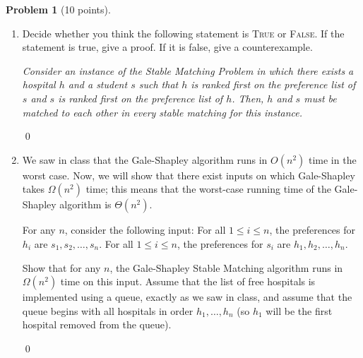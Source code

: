 \documentclass[12pt]{article}
\theoremstyle{definition}
\newtheorem{question}{Problem}
\newenvironment{solution}{\bigskip\noindent{\em Solution.}  \ignorespaces}{\hfill\qed}
\begin{document}
\begin{question}[10 points]
	
\begin{enumerate}[label=(\alph*), leftmargin=*]   
    \item Decide whether you think the following statement is \textsc{True} or \textsc{False}.  If the statement is true, give a proof.  If it is false, give a counterexample.\\

  \smallskip

 {\em Consider an instance of the Stable Matching Problem in which there exists a hospital $h$ and a student $s$ such that $h$ is ranked first on the preference list of $s$ and $s$ is ranked first on the preference list of $h$.  Then, $h$ and $s$ must be matched to each other in every stable matching for this instance.}


    \begin{solution}

    \end{solution}



    \item We saw in class that the Gale-Shapley algorithm runs in $O(n^2)$ time in the worst case.  Now, we will show that there exist inputs on which Gale-Shapley takes $\Omega(n^2)$ time; this means that the worst-case running time of the Gale-Shapley algorithm is $\Theta(n^2)$.

  \smallskip

 For any $n$, consider the following input:
  For all $1\leq i\leq n$, the preferences for $h_i$ are $s_1, s_2, \ldots, s_n$. For all $1\leq i\leq n$, the preferences for $s_i$ are $h_1, h_2, \ldots, h_n$.

  Show that for any $n$, the Gale-Shapley Stable Matching algorithm runs in $\Omega(n^2)$ time on this input.  Assume that the list of free hospitals is implemented using a queue, exactly as we saw in class, and assume that the queue begins with all hospitals in order $h_1,\ldots, h_n$ (so $h_1$ will be the first hospital removed from the queue).

        	

    \begin{solution}

    \end{solution}


	
\end{enumerate}
\end{question}
\end{document}
